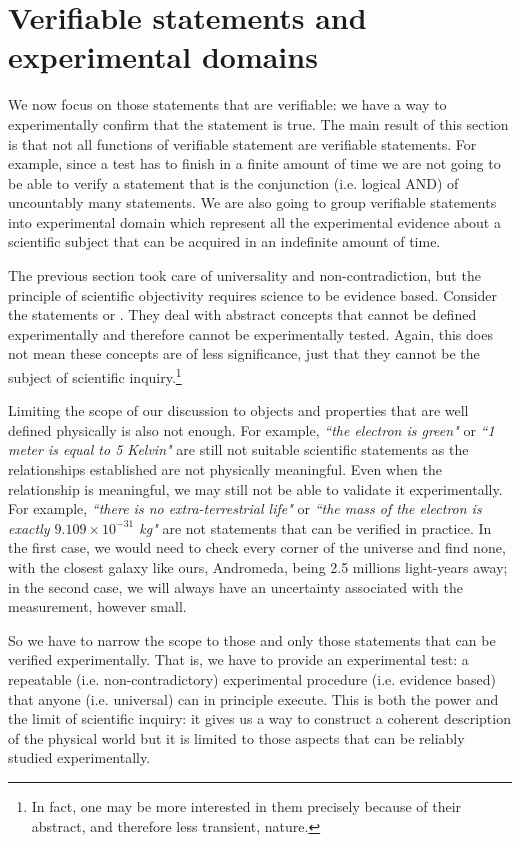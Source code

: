 \documentclass[11pt,letterpaper,fleqn]{memoir} %
\begin{document}
\section{Verifiable statements and experimental domains}

We now focus on those statements that are verifiable: we have a way to experimentally confirm that the statement is true. The main result of this section is that not all functions of verifiable statement are verifiable statements. For example, since a test has to finish in a finite amount of time we are not going to be able to verify a statement that is the conjunction (i.e. logical AND) of uncountably many statements. We are also going to group verifiable statements into experimental domain which represent all the experimental evidence about a scientific subject that can be acquired in an indefinite amount of time.

The previous section took care of universality and non-contradiction, but the principle of scientific objectivity requires science to be evidence based. Consider the statements  or . They deal with abstract concepts that cannot be defined experimentally and therefore cannot be experimentally tested. Again, this does not mean these concepts are of less significance, just that they cannot be the subject of scientific inquiry.\footnote{In fact, one may be more interested in them precisely because of their abstract, and therefore less transient, nature.}

Limiting the scope of our discussion to objects and properties that are well defined physically is also not enough. For example, \emph{``the electron is green"} or \emph{``1 meter is equal to 5 Kelvin"} are still not suitable scientific statements as the relationships established are not physically meaningful. Even when the relationship is meaningful, we may still not be able to validate it experimentally. For example, \emph{``there is no extra-terrestrial life"} or \emph{``the mass of the electron is exactly $9.109 \times 10^{-31}$ kg"} are not statements that can be verified in practice. In the first case, we would need to check every corner of the universe and find none, with the closest galaxy like ours, Andromeda, being 2.5 millions light-years away; in the second case, we will always have an uncertainty associated with the measurement, however small.

So we have to narrow the scope to those and only those statements that can be verified experimentally. That is, we have to provide an experimental test: a repeatable (i.e. non-contradictory) experimental procedure (i.e. evidence based) that anyone (i.e. universal) can in principle execute. This is both the power and the limit of scientific inquiry: it gives us a way to construct a coherent description of the physical world but it is limited to those aspects that can be reliably studied experimentally.
\end{document}
